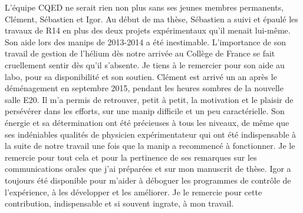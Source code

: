 \bigskip
L'équipe CQED ne serait rien non plus sans ses jeunes membres permanents, Clément, Sébastien et Igor.
Au début de ma thèse, Sébastien a suivi et épaulé les travaux de R14 en plus des deux projets expérimentaux qu'il menait lui-même.
Son aide lors des manips de 2013-2014 a été inestimable.
L'importance de son travail de gestion de l'hélium dès notre arrivée au Collège de France se fait cruellement sentir dès qu'il s'absente.
Je tiens à le remercier pour son aide au labo, pour sa disponibilité et son soutien.
Clément est arrivé un an après le déménagement en septembre 2015, pendant les heures sombres de la nouvelle salle E20.
Il m'a permis de retrouver, petit à petit, la motivation et le plaisir de persévérer dans les efforts, sur une manip difficile et un peu caractérielle.
Son énergie et sa détermination ont été précieuses à tous les niveaux, de même que ses indéniables qualités de physicien expérimentateur qui ont été indispensable à la suite de notre travail une fois que la manip a recommencé à fonctionner.
Je le remercie pour tout cela et pour la pertinence de ses remarques sur les communications orales que j'ai préparées et sur mon manuscrit de thèse.
Igor a toujours été disponible pour m'aider à déboguer les programmes de contrôle de l'expérience, à les développer et les améliorer.
Je le remercie pour cette contribution, indispensable et si souvent ingrate, à mon travail.

